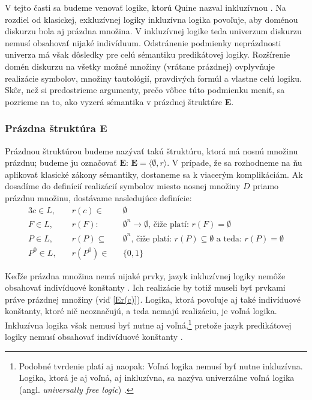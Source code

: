 \documentclass[12pt, letterpaper]{article}
\begin{document}
V tejto časti sa budeme venovať logike, ktorú Quine nazval inkluzívnou \parencites[177]{quine_quantification_1954}. Na rozdiel od klasickej, exkluzívnej logiky inkluzívna logika povoľuje, aby doménou diskurzu bola aj prázdna množina. V inkluzívnej logike teda univerzum diskurzu nemusí obsahovať nijaké indivíduum. Odstránenie podmienky neprázdnosti univerza má však dôsledky pre celú sémantiku predikátovej logiky. Rozšírenie domén diskurzu na všetky možné množiny (vrátane prázdnej) ovplyvňuje realizácie symbolov, množiny tautológií, pravdivých formúl a vlastne celú logiku. Skôr, než si predostrieme argumenty, prečo vôbec túto podmienku meniť, sa pozrieme na to, ako vyzerá sémantika v prázdnej štruktúre \textbf{E}.

\subsubsection{Prázdna štruktúra \textbf{E}}
Prázdnou štruktúrou budeme nazývať takú štruktúru, ktorá má nosnú množinu prázdnu; budeme ju označovať $\textbf{E}$: $\textbf{E} = \langle\emptyset,r\rangle$. V prípade, že sa rozhodneme na ňu aplikovať klasické zákony sémantiky, dostaneme sa k viacerým komplikáciám. Ak dosadíme do definícií realizácií symbolov miesto nosnej množiny $D$ priamo prázdnu množinu, dostávame nasledujúce definície:
\begin{alignat}{3}
		c \in L,\quad &r(c) \in&& \emptyset \label{Er(c)} \\
		F \in L,\quad &r(F):&& \emptyset^n \rightarrow \emptyset  \text{, čiže platí: } r(F) = \emptyset \label{Er(F)} \\
		P \in L,\quad &r(P)\subseteq&& \emptyset^n \text{, čiže platí: } r(P) \subseteq \emptyset \text{ a teda: } r(P) = \emptyset \label{Er(P)}  \\
		P^0 \in L,\quad &r(P^0) \in&& \{0, 1\} \label{Er(P0)}
\end{alignat}

\noindent Keďže prázdna množina nemá nijaké prvky, jazyk inkluzívnej logiky nemôže obsahovať indivíduové konštanty \parencites[170]{amer}[147]{mendelson_introduction_2015}. Ich realizácie by totiž museli byť prvkami práve prázdnej množiny (viď \ref{Er(c)}). Logika, ktorá povoľuje aj také indivíduové konštanty, ktoré nič neoznačujú, a teda nemajú realizáciu, je voľná logika. Inkluzívna logika však nemusí byť nutne aj voľná,\footnote{Podobné tvrdenie platí aj naopak: Voľná logika nemusí byť nutne inkluzívna. Logika, ktorá je aj voľná, aj inkluzívna, sa nazýva univerzálne voľná logika (angl. \textit{universally free logic}) \parencites[8]{meyerlambert}[1025]{Nolt2007}.} pretože jazyk predikátovej logiky nemusí obsahovať indivíduové konštanty \parencites{sep-logic-free}[3]{williamson_note_1999}.\par
\end{document}
